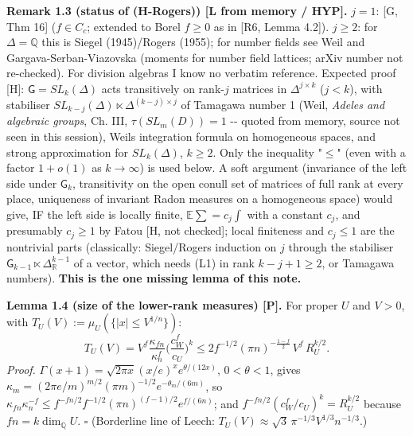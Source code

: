 \textbf{Remark 1.3 (status of (H-Rogers)) {[}L from memory / HYP{]}.} \(j=1\): {[}G, Thm 16{]} (\(f\in C_c\); extended to Borel \(f\ge0\) as in {[}R6, Lemma 4.2{]}). \(j\ge2\): for \(\Delta=\mathbb Q\) this is Siegel (1945)/Rogers (1955); for number fields see Weil and Gargava-Serban-Viazovska (moments for number field lattices; arXiv number not re-checked). For division algebras I know no verbatim reference. Expected proof {[}H{]}: \(\mathsf G=SL_k(\Delta)\) acts transitively on rank-\(j\) matrices in \(\Delta^{j\times k}\) (\(j<k\)), with stabiliser \(SL_{k-j}(\Delta)\ltimes\Delta^{(k-j)\times j}\) of Tamagawa number 1 (Weil, \emph{Adeles and algebraic groups}, Ch. III, \(\tau(SL_m(D))=1\) -\/- quoted from memory, source not seen in this session), Weil\textquotesingle s integration formula on homogeneous spaces, and strong approximation for \(SL_k(\Delta)\), \(k\ge2\). Only the inequality "\(\le\)" (even with a factor \(1+o(1)\) as \(k\to\infty\)) is used below. A soft argument (invariance of the left side under \(\mathsf G_k\), transitivity on the open conull set of matrices of full rank at every place, uniqueness of invariant Radon measures on a homogeneous space) would give, IF the left side is locally finite, \(\mathbb E\sum=c_j\int\) with a constant \(c_j\), and presumably \(c_j\ge1\) by Fatou {[}H, not checked{]}; local finiteness and \(c_j\le1\) are the nontrivial parts (classically: Siegel/Rogers induction on \(j\) through the stabiliser \(\mathsf G_{k-1}\ltimes\Delta_{\mathbb R}^{k-1}\) of a vector, which needs (L1) in rank \(k-j+1\ge2\), or Tamagawa numbers). \textbf{This is the one missing lemma of this note.}

\textbf{Lemma 1.4 (size of the lower-rank measures) {[}P{]}.} For proper \(U\) and \(V>0\), with \(T_U(V):=\mu_U(\{|x|\le V^{1/n}\})\):
\[T_U(V)=V^f\frac{\kappa_{fn}}{\kappa_n^f}\Big(\frac{c_W^f}{c_U}\Big)^k\le 2f^{-1/2}(\pi n)^{-\frac{1-f}2}\,V^f\,R_U^{k/2}.\]
\emph{Proof.} \(\Gamma(x+1)=\sqrt{2\pi x}(x/e)^xe^{\theta/(12x)}\), \(0<\theta<1\), gives \(\kappa_m=(2\pi e/m)^{m/2}(\pi m)^{-1/2}e^{-\theta_m/(6m)}\), so \(\kappa_{fn}\kappa_n^{-f}\le f^{-fn/2}f^{-1/2}(\pi n)^{(f-1)/2}e^{f/(6n)}\); and \(f^{-fn/2}(c_W^f/c_U)^k=R_U^{k/2}\) because \(fn=k\dim_{\mathbb Q}U\). \(\square\) (Borderline line of Leech: \(T_U(V)\approx\sqrt3\,\pi^{-1/3}V^{1/3}n^{-1/3}\).)


